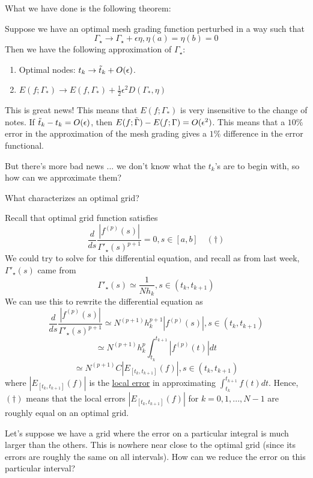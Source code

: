 \documentclass{article}
\begin{document}
What we have done is the following theorem:
\begin{theorem}
    Suppose we have an optimal mesh grading function perturbed in a way such that
    \[\Gamma_\star \to \Gamma_\star + \epsilon \eta, \eta(a) = \eta(b) = 0\]
    Then we have the following approximation of $\Gamma_\star$:
    \begin{enumerate}
        \item Optimal nodes: $t_k \to \Tilde{t}_k + O(\epsilon)$.
        \item $E(f; \Gamma_*) \to E(f, \Gamma_*) + \frac{1}{2} \epsilon^2 D(\Gamma_*, \eta)$
    \end{enumerate}
\end{theorem}

\begin{remark}
    This is great news! This means that $E(f; \Gamma_*)$ is very insensitive to the change of notes. If $\Tilde{t}_k - t_k = O(\epsilon)$, then $E(f; \Tilde{\Gamma}) - E(f; \Gamma) = O(\epsilon^2)$. This means that a $10\%$ error in the approximation of the mesh grading gives a $1\%$ difference in the error functional. 
\end{remark}

But there's more bad news ... we don't know what the $t_k$'s are to begin with, so how can we approximate them?

\begin{question}
    What characterizes an optimal grid?
\end{question}

Recall that optimal grid function satisfies
\[\frac{d}{ds} \frac{|f^{(p)}(s)|}{\Gamma'_\star(s)^{p+1}} = 0, s \in [a, b] \quad (\dagger)\]
We could try to solve for this differential equation, and recall as from last week, $\Gamma'_\star(s)$ came from
\[\Gamma'_\star(s) \simeq \frac{1}{N h_k}, s \in (t_k, t_{k+1})\]
We can use this to rewrite the differential equation as
\[\frac{d}{ds} \frac{|f^{(p)}(s)|}{\Gamma'_\star(s)^{p+1}} \simeq N^{(p+1)} h_k^{p+1} |f^{(p)}(s)|, s \in (t_k, t_{k+1})\]
\[\simeq N^{(p+1)} h_k^p \int_{t_k}^{t_{k+1}} |f^{(p)}(t)| dt\]
\[\simeq N^{(p+1)} C | E_{[t_k, t_{k+1}]}(f)|, s \in (t_k, t_{k+1}) \]
where $| E_{[t_k, t_{k+1}]}(f)|$ is the \underline{local error} in approximating $\int_{t_k}^{t_{k+1}} f(t) dt$. Hence, $(\dagger)$ means that the local errors $|E_{[t_k, t_{k+1}]}(f)|$ for $k = 0, 1, ..., N-1$ are roughly equal on an optimal grid.

\begin{question}
    Let's suppose we have a grid where the error on a particular integral is much larger than the others. This is nowhere near close to the optimal grid (since its errors are roughly the same on all intervals). How can we reduce the error on this particular interval?
\end{question}
\end{document}

